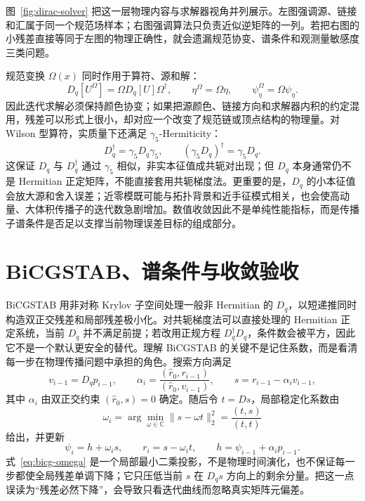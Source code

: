 \documentclass[UTF8,12pt,a4paper,twoside,openany]{ctexbook}
\begin{document}
图~\ref{fig:dirac-solver} 把这一层物理内容与求解器视角并列展示。左图强调源、链接和汇属于同一个规范场样本；右图强调算法只负责近似逆矩阵的一列。若把右图的小残差直接等同于左图的物理正确性，就会遗漏规范协变、谱条件和观测量敏感度三类问题。

规范变换 \(\Omega(x)\) 同时作用于算符、源和解：
\begin{equation}
  D_q[U^\Omega]=\Omega D_q[U]\Omega^\dagger,
  \qquad
  \eta^\Omega=\Omega\eta,
  \qquad
  \psi_\eta^\Omega=\Omega\psi_\eta .
  \label{eq:diracgaugecov}
\end{equation}
因此迭代求解必须保持颜色协变；如果把源颜色、链接方向和求解器内积的约定混用，残差可以形式上很小，却对应一个改变了规范链或顶点结构的物理量。对 Wilson 型算符，实质量下还满足 \(\gamma_5\)-Hermiticity：
\begin{equation}
  D_q^\dagger=\gamma_5D_q\gamma_5,
  \qquad
  (\gamma_5D_q)^\dagger=\gamma_5D_q .
  \label{eq:gamma5hermiticity}
\end{equation}
这保证 \(D_q\) 与 \(D_q^\dagger\) 通过 \(\gamma_5\) 相似，非实本征值成共轭对出现；但 \(D_q\) 本身通常仍不是 Hermitian 正定矩阵，不能直接套用共轭梯度法。更重要的是，\(D_q\) 的小本征值会放大源和舍入误差；近零模既可能与拓扑背景和近手征模式相关，也会使高动量、大体积传播子的迭代数急剧增加。数值收敛因此不是单纯性能指标，而是传播子谱条件是否足以支撑当前物理误差目标的组成部分。

\section{BiCGSTAB、谱条件与收敛验收}

BiCGSTAB 用非对称 Krylov 子空间处理一般非 Hermitian 的 \(D_q\)，以短递推同时构造双正交残差和局部残差极小化\cite{VanDerVorst1992}。对共轭梯度法可以直接处理的 Hermitian 正定系统，当前 \(D_q\) 并不满足前提；若改用正规方程 \(D_q^\dagger D_q\)，条件数会被平方，因此它不是一个默认更安全的替代。理解 BiCGSTAB 的关键不是记住系数，而是看清每一步在物理传播问题中承担的角色。搜索方向满足
\begin{equation}
  v_{i-1}=D_qp_{i-1},
  \qquad
  \alpha_i=\frac{(\hat r_0,r_{i-1})}{(\hat r_0,v_{i-1})},
  \qquad
  s=r_{i-1}-\alpha_i v_{i-1},
  \label{eq:bicg-alpha}
\end{equation}
其中 \(\alpha_i\) 由双正交约束 \((\hat r_0,s)=0\) 确定。随后令 \(t=Ds\)，局部稳定化系数由
\begin{equation}
  \omega_i
  =\arg\min_{\omega\in\mathbb C}\|s-\omega t\|_2^2
  =\frac{(t,s)}{(t,t)}
  \label{eq:bicg-omega}
\end{equation}
给出，并更新
\begin{equation}
  \psi_i=h+\omega_i s,
  \qquad
  r_i=s-\omega_i t,
  \qquad
  h=\psi_{i-1}+\alpha_i p_{i-1}.
  \label{eq:bicg-update}
\end{equation}
式~\eqref{eq:bicg-omega} 是一个局部最小二乘投影，不是物理时间演化，也不保证每一步都使全局残差单调下降；它只压低当前 \(s\) 在 \(D_qs\) 方向上的剩余分量。把这一点误读为“残差必然下降”，会导致只看迭代曲线而忽略真实矩阵元偏差。
\end{document}
